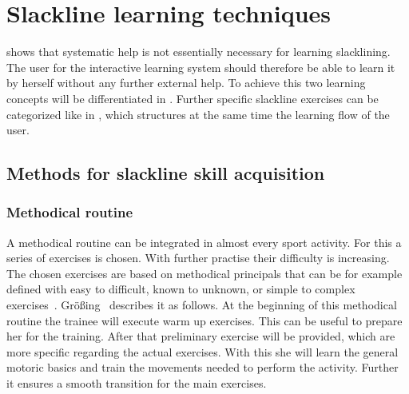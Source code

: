 \section{Slackline learning techniques}\label{3_3_learningTechniques}
\textbf{} shows that systematic help is not essentially necessary for learning slacklining. The user for the interactive learning system should therefore be able to learn it by herself without any further external help. To achieve this two learning concepts will be differentiated in \textbf{}. Further specific slackline exercises can be categorized like in \textbf{}, which structures at the same time the learning flow of the user.

\subsection{Methods for slackline skill acquisition}\label{3_3_1_learningConcepts}
\subsubsection{Methodical routine}
A methodical routine can be integrated in almost every sport activity. For this a series of exercises is chosen. With further practise their difficulty is increasing. The chosen exercises are based on methodical principals that can be for example defined with easy to difficult, known to unknown, or simple to complex exercises~\cite{Fetz1996-ml}. Größing~\cite{Groessing1997-sp} describes it as follows. At the beginning of this methodical routine the trainee will execute warm up exercises. This can be useful to prepare her for the training. After that preliminary exercise will be provided, which are more specific regarding the actual exercises. With this she will learn the general motoric basics and train the movements needed to perform the activity. Further it ensures a smooth transition for the main exercises.

